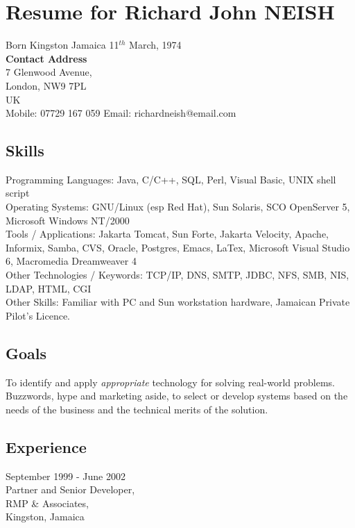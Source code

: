 \documentclass{article}[10]
\begin{document}
\section*{Resume for Richard John NEISH}
Born Kingston Jamaica 11$^{th}$ March, 1974\\
{\bf Contact Address}\\
7 Glenwood Avenue,\\
London, NW9 7PL\\
UK\\
Mobile: 07729 167 059 \hspace{0.3 in} Email: richardneish@email.com
\subsection*{Skills}
Programming Languages: Java, C/C++, SQL, Perl, Visual Basic, UNIX shell script \\
Operating Systems: GNU/Linux (esp Red Hat), Sun Solaris, SCO OpenServer 5, Microsoft Windows NT/2000 \\
Tools / Applications: Jakarta Tomcat, Sun Forte, Jakarta Velocity, Apache, Informix, Samba, CVS, Oracle, Postgres, Emacs, LaTex, Microsoft Visual Studio 6, Macromedia Dreamweaver 4 \\
Other Technologies / Keywords: TCP/IP, DNS, SMTP, JDBC, NFS, SMB, NIS, LDAP, HTML, CGI \\
Other Skills: Familiar with PC and Sun workstation hardware, Jamaican Private Pilot's Licence.
\subsection*{Goals}
To identify and apply {\em appropriate} technology for solving real-world problems.  Buzzwords, hype and marketing aside, to select or develop systems based on the needs of the business and the technical merits of the solution.
\subsection*{Experience}
\noindent September 1999 - June 2002\\
Partner and Senior Developer,\\
RMP \& Associates,\\
Kingston, Jamaica
\end{document}
